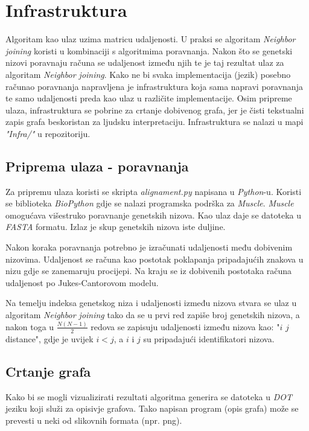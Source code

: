 \documentclass[times, utf8, seminar, numeric]{fer}
\begin{document}
\section{Infrastruktura}
Algoritam kao ulaz uzima matricu udaljenosti. U praksi se algoritam \emph{Neighbor joining} koristi u kombinaciji s algoritmima poravnanja. Nakon što se genetski nizovi poravnaju računa se udaljenost između njih te je taj rezultat ulaz za algoritam \emph{Neighbor joining}. Kako ne bi svaka implementacija (jezik) posebno računao poravnanja napravljena je infrastruktura koja sama napravi poravnanja te samo udaljenosti preda kao ulaz u različite implementacije. Osim pripreme ulaza, infrastruktura se pobrine za crtanje dobivenog grafa, jer je čisti tekstualni zapis grafa beskoristan za ljudsku interpretaciju. Infrastruktura se nalazi u mapi \emph{"Infra/"} u repozitoriju.

\subsection{Priprema ulaza - poravnanja}

Za pripremu ulaza koristi se skripta \emph{alignament.py} napisana u \emph{Python}-u. Koristi se biblioteka \emph{BioPython} gdje se nalazi programska podrška za \emph{Muscle}. \emph{Muscle} omogućava višestruko poravnanje genetskih nizova. Kao ulaz daje se datoteka u \emph{FASTA} formatu. Izlaz je skup genetskih nizova iste duljine.
 
Nakon koraka poravnanja potrebno je izračunati udaljenosti među dobivenim nizovima. Udaljenost se računa kao postotak poklapanja pripadajućih znakova u nizu gdje se zanemaruju procijepi. Na kraju se iz dobivenih postotaka računa udaljenost po Jukes-Cantorovom modelu.

Na temelju indeksa genetskog niza i udaljenosti između nizova stvara se ulaz u algoritam  \emph{Neighbor joining} tako da se u prvi red zapiše broj genetskih nizova, a nakon toga u $\frac{N(N-1)}{2}$ redova se zapisuju udaljenosti između nizova kao: "$i$ $j$ distance", gdje je uvijek $i<j$, a $i$ i $j$ su pripadajući identifikatori nizova.

\subsection{Crtanje grafa}

Kako bi se mogli vizualizirati rezultati algoritma generira se datoteka u \emph{DOT} jeziku koji služi za opisivje grafova. Tako napisan program (opis grafa) može se prevesti u neki od slikovnih formata (npr. png).
\end{document}

